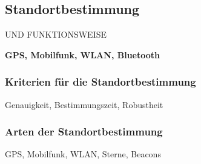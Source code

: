 \subsection{Standortbestimmung}
UND FUNKTIONSWEISE

\textbf{GPS, Mobilfunk, WLAN, Bluetooth}

\subsubsection{Kriterien für die Standortbestimmung}
Genauigkeit, Bestimmungszeit, Robustheit

\subsubsection{Arten der Standortbestimmung}
GPS, Mobilfunk, WLAN, Sterne, Beacons
